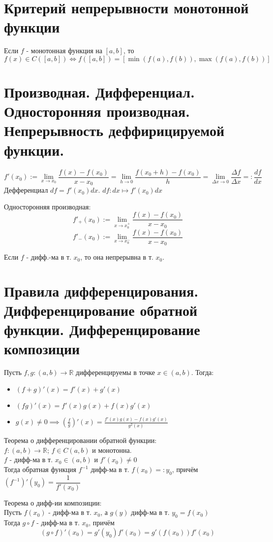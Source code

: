 \documentclass[11pt, a4paper, utf-8]{article}
\def\R{\mathbb{R}}
\begin{document}
    \section{Критерий непрерывности монотонной функции}
    Если $f$ - монотонная функция на $[a, b]$, то
    $$f(x) \in C([a, b]) \iff f([a, b]) = [\min (f(a), f(b)), \max (f(a), f(b))]$$

    \section{Производная. Дифференциал. Односторонняя производная. Непрерывность деффирицируемой функции.}
    $$f' (x_0) := \lim_{x \to x_0} \frac{f(x) - f(x_0)}{x-x_0} = \lim_{h \to 0} \frac{f(x_0 + h) - f(x_0)}{h} = \lim_{\Delta x \to 0} \frac{\Delta f}{\Delta x} =: \frac{df}{dx}$$
    Дефференциал $df = f'(x_0) dx$. $df: dx \mapsto f'(x_0) dx$

    Односторонняя производная:
    $$f'_+(x_0) := \lim_{x \to x_0^+} \frac{f(x) - f(x_0)}{x - x_0}$$
    $$f'_-(x_0) := \lim_{x \to x_0^-} \frac{f(x) - f(x_0)}{x - x_0}$$

    Если $f$ - дифф.-ма в т. $x_0$, то она непрерывна в т. $x_0$.

    \section{Правила дифференцирования. Дифференцирование обратной функции. Дифференцирование композиции}
    Пусть $f, g: (a,b) \to \R$ дифференцируемы в точке $x \in (a,b)$. Тогда:\\
    \begin{itemize}
        \item $(f+g)'(x) = f'(x) + g'(x)$
        \item $(fg)'(x) = f'(x)g(x) + f(x)g'(x)$
        \item $\displaystyle g(x) \neq 0 \implies \left(\frac{f}{g}\right)'(x) = \frac{f'(x)g(x) - f(x)g'(x)}{g^2(x)}$
    \end{itemize}

    Теорема о дифференцировании обратной функции:\\
    $f: (a,b) \to \R$; $f \in C(a,b)$ и монотонна.\\
    $f$ - дифф-ма в т. $x_0 \in (a,b)$ и $f'(x_0) \neq 0$\\
    Тогда обратная функция $f^{-1}$ дифф-ма в т. $f(x_0) =: y_0$, причём $(f^{-1})'(y_0) = \dfrac{1}{f'(x_0)}$

    Теорема о дифф-ии композиции:\\
    Пусть $f(x_0)$ - дифф-ма в т. $x_0$, а $g(y)$ дифф-ма в т. $y_0 = f(x_0)$\\
    Тогда $g \circ f$ - дифф-ма в т. $x_0$, причём
    $$(g \circ f)'(x_0) = g'(y_0)f'(x_0) = g'(f(x_0))f'(x_0)$$
\end{document}
